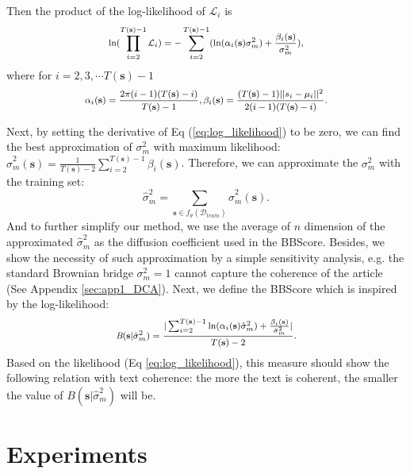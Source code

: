 \documentclass[letterpaper]{article}
\def \bb{\textit{B}}
\def \ss{\mathbf{s}}
\begin{document}
Then the product of the log-likelihood of $\mathcal{L}_i$ is
\begin{equation}
\footnotesize
\begin{aligned}
\label{eq:log_likelihood}
\ln (\prod_{i=2}^{T(\ss)-1} \mathcal{L}_i) = -\sum_{i=2}^{T(\ss)-1} (\ln(\alpha_i(\ss) \sigma_m^2) + \frac{\beta_i(\ss)}{\sigma_m^2}),
\end{aligned}
\end{equation}
where for $i=2,3,\cdots T(\ss)-1$
\begin{equation*}
\footnotesize
\begin{aligned}
\alpha_i(\ss) = \frac{2\pi (i-1)(T(\ss)-i)}{T(\ss)-1}, \beta_i(\ss) = \frac{(T(\ss)-1)||s_i -\mu_i||^2}{ 2(i-1) (T(\ss)-i)}.
\end{aligned}
\end{equation*}

Next, by setting the derivative of Eq (\ref{eq:log_likelihood}) to be zero, we can find the best approximation of $\sigma_m^2$ with maximum likelihood: $\hat{\sigma}_m^2(\ss) = \frac{1}{T(\ss)-2} \sum_{i=2}^{T(\ss)-1} \beta_i(\ss)$. Therefore, we can approximate the $\sigma_m^2$ with the training set: \[\hat{\sigma}_m^2 = \sum_{\ss \in f_\theta(\mathcal{D}_{train})} \hat{\sigma}_m^2(\ss).\]
And to further simplify our method, we use the average of $n$ dimension of the approximated $\hat{\sigma}_m^2$ as the diffusion coefficient used in the BBScore. Besides, we show the necessity of such approximation by a simple sensitivity analysis, e.g. the standard Brownian bridge $\sigma_m^2=1$ cannot capture the coherence of the article (See Appendix \ref{sec:app1_DCA}). Next, we define the BBScore which is inspired by the log-likelihood:
\begin{equation}
\label{eq:evaluation_measure}
\footnotesize
\begin{aligned}
\bb (\ss| \hat{\sigma}_m^2) = \frac{|\sum_{i=2}^{T(\ss)-1} \ln(\alpha_i(\ss) \hat{\sigma}_m^2)+ \frac{\beta_i(\ss)}{\hat{\sigma}_m^2}|}{T(\ss)-2}.
\end{aligned}
\end{equation}
Based on the likelihood (Eq \eqref{eq:log_likelihood}), this measure should show the following relation with text coherence: the more the text is coherent, the smaller the value of $\bb (\ss| \hat{\sigma}_m^2)$ will be.

\section{Experiments}
\end{document}
